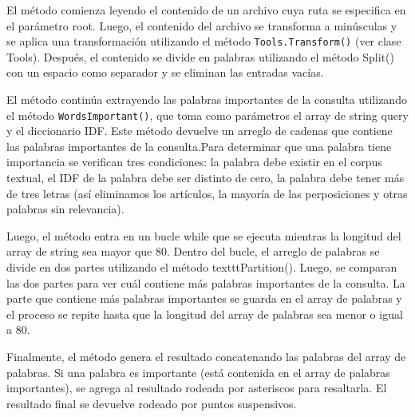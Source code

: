 \documentclass[12pt,a4paper]{report}
\begin{document}
El método comienza leyendo el contenido de un archivo cuya ruta se especifica en el parámetro root. Luego, el contenido del archivo se transforma a minúsculas y se aplica una transformación utilizando el método \texttt{Tools.Transform()} (ver clase Tools). Después, el contenido se divide en palabras utilizando el método Split() con un espacio como separador y se eliminan las entradas vacías.\par

El método continúa extrayendo las palabras importantes de la consulta utilizando el método \texttt{WordsImportant()}, que toma como parámetros el array de string query y el diccionario IDF. Este método devuelve un arreglo de cadenas que contiene las palabras importantes de la consulta.Para determinar que una palabra tiene importancia se verifican tres condiciones: la palabra debe existir en el corpus textual, el IDF de la palabra debe ser distinto de cero, la palabra debe tener más de tres letras (así eliminamos los artículos, la mayoría de las perposiciones y otras palabras sin relevancia).

Luego, el método entra en un bucle while que se ejecuta mientras la longitud del array de string sea mayor que 80. Dentro del bucle, el arreglo de palabras se divide en dos partes utilizando el método texttt{Partition()}. Luego, se comparan las dos partes para ver cuál contiene más palabras importantes de la consulta. La parte que contiene más palabras importantes se guarda en el array de palabras y el proceso se repite hasta que la longitud del array de palabras sea menor o igual a 80.

Finalmente, el método genera el resultado concatenando las palabras del array de palabras. Si una palabra es importante (está contenida en el array de palabras importantes), se agrega al resultado rodeada por asteriscos para resaltarla. El resultado final se devuelve rodeado por puntos suspensivos.
\end{document}
